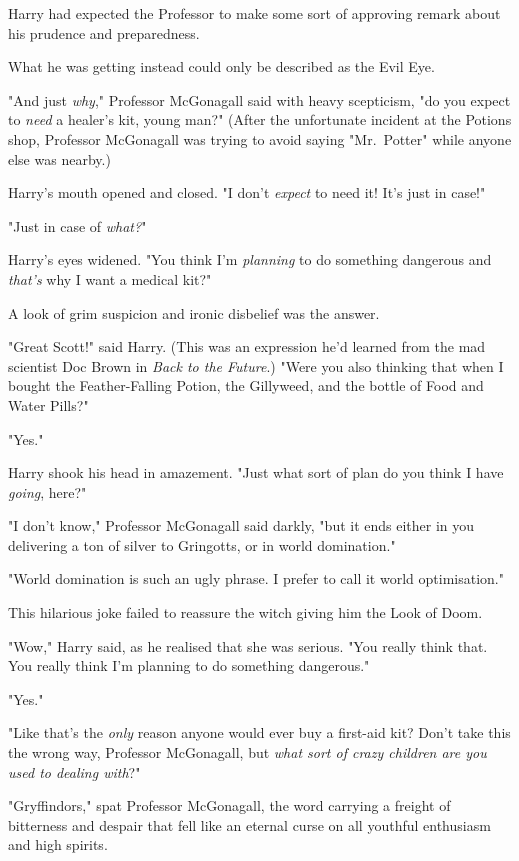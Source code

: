 Harry had expected the Professor to make some sort of approving remark about 
his prudence and preparedness.

What he was getting instead could only be described as the Evil Eye.

"And just \emph{why}," Professor McGonagall said with heavy scepticism, "do you 
expect to \emph{need} a healer's kit, young man?" (After the unfortunate 
incident at the Potions shop, Professor McGonagall was trying to avoid saying 
"Mr.~Potter" while anyone else was nearby.)

Harry's mouth opened and closed. "I don't \emph{expect} to need it! It's just 
in case!"

"Just in case of \emph{what?}"

Harry's eyes widened. "You think I'm \emph{planning} to do something dangerous 
and \emph{that's} why I want a medical kit?"

A look of grim suspicion and ironic disbelief was the answer.

"Great Scott!" said Harry. (This was an expression he'd learned from the mad 
scientist Doc Brown in \emph{Back to the Future}.) "Were you also thinking that 
when I bought the Feather-Falling Potion, the Gillyweed, and the bottle of Food 
and Water Pills?"

"Yes."

Harry shook his head in amazement. "Just what sort of plan do you think I have 
\emph{going}, here?"

"I don't know," Professor McGonagall said darkly, "but it ends either in you 
delivering a ton of silver to Gringotts, or in world domination."

"World domination is such an ugly phrase. I prefer to call it world 
optimisation."

This hilarious joke failed to reassure the witch giving him the Look of Doom.

"Wow," Harry said, as he realised that she was serious. "You really think that. 
You really think I'm planning to do something dangerous."

"Yes."

"Like that's the \emph{only} reason anyone would ever buy a first-aid kit? 
Don't take this the wrong way, Professor McGonagall, but \emph{what sort of 
crazy children are you used to dealing with}?"

"Gryffindors," spat Professor McGonagall, the word carrying a freight of 
bitterness and despair that fell like an eternal curse on all youthful 
enthusiasm and high spirits.


